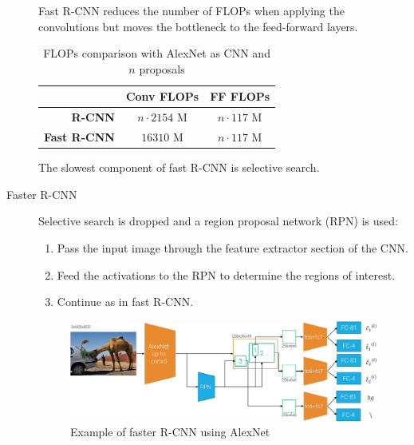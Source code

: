 \begin{description}
        \begin{remark}
            Fast R-CNN reduces the number of FLOPs when applying the convolutions but moves the bottleneck to the feed-forward layers.
            \begin{table}[H]
                \centering
                \footnotesize
                \begin{tabular}{rcc}
                    \toprule
                    & \textbf{Conv FLOPs} & \textbf{FF FLOPs} \\
                    \midrule
                    \textbf{R-CNN} & $n \cdot 2154$ M & $n \cdot 117$ M \\
                    \textbf{Fast R-CNN} & $\num{16310}$ M & $n \cdot 117$ M \\
                    \bottomrule
                \end{tabular}
                \caption{FLOPs comparison with AlexNet as CNN and $n$ proposals}
            \end{table}
        \end{remark}

        \begin{remark}
            The slowest component of fast R-CNN is selective search.
        \end{remark}

    \item[Faster R-CNN] 
        Selective search is dropped and a region proposal network (RPN) is used:
        \begin{enumerate}
            \item Pass the input image through the feature extractor section of the CNN.
            \item Feed the activations to the RPN to determine the regions of interest.
            \item Continue as in fast R-CNN.
        \end{enumerate}

        \begin{figure}[H]
            \centering
            \includegraphics[width=0.8\linewidth]{./img/_faster_r_cnn.jpg}
            \caption{Example of faster R-CNN using AlexNet}
        \end{figure}


\end{description}
